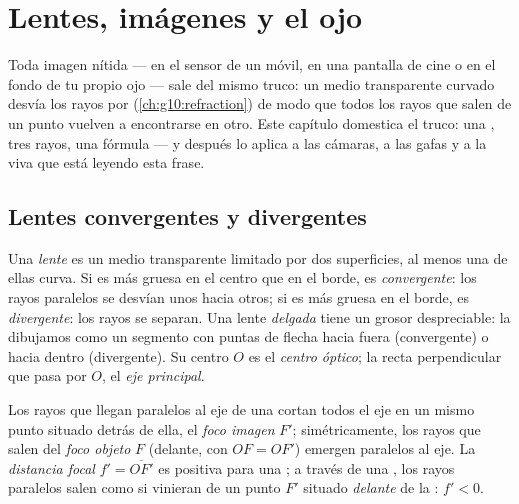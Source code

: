 \chapter{Lentes, imágenes y el ojo}\label{ch:g11:lenses-and-eye}

Toda imagen nítida --- en el sensor de un móvil, en una pantalla de cine
o en el fondo de tu propio ojo --- sale del mismo truco: un medio
transparente curvado desvía los rayos por 
(\cref{ch:g10:refraction}) de modo que todos los rayos que salen de un
punto vuelven a encontrarse en otro. Este capítulo domestica el truco:
una , tres rayos, una fórmula --- y después lo aplica a las
cámaras, a las gafas y a la  viva que está leyendo esta frase.

\section{Lentes convergentes y divergentes}

\begin{definition}\label{def:g11:lenses-and-eye:lens}
Una \emph{lente} es un medio transparente limitado por dos
superficies, al menos una de ellas curva. Si es más gruesa en el centro
que en el borde, es \emph{convergente}: los
rayos paralelos se desvían unos hacia otros; si es más gruesa en el
borde, es \emph{divergente}: los rayos se
separan. Una lente \emph{delgada} tiene un grosor
despreciable: la dibujamos como un segmento con puntas de flecha hacia
fuera (convergente) o hacia dentro (divergente). Su centro $O$ es el
\emph{centro óptico}; la recta perpendicular que
pasa por $O$, el \emph{eje principal}.
\end{definition}

\begin{definition}\label{def:g11:lenses-and-eye:focal}
Los rayos que llegan paralelos al eje de una  cortan
todos el eje en un mismo punto situado detrás de ella, el \emph{foco
imagen} $F'$; simétricamente, los rayos que salen del
\emph{foco objeto} $F$ (delante, con $OF = OF'$) emergen paralelos al
eje. La \emph{distancia focal}
$f' = \overline{OF'}$ es positiva para una ; a través
de una , los rayos paralelos salen como si vinieran de
un punto $F'$ situado \emph{delante} de la : $f' < 0$.
\end{definition}

